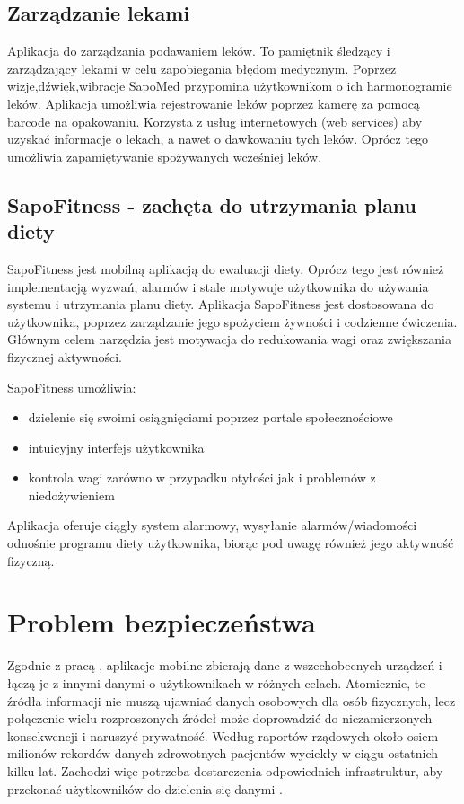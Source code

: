\subsection{Zarządzanie lekami \cite{6655256}}
 Aplikacja do zarządzania podawaniem leków. To pamiętnik śledzący i zarządzający lekami w celu zapobiegania błędom medycznym. 
 Poprzez wizje,dźwięk,wibracje  SapoMed przypomina użytkownikom o ich harmonogramie leków.
 Aplikacja umożliwia rejestrowanie leków poprzez kamerę za pomocą barcode na opakowaniu. 
 Korzysta z usług internetowych (web services) aby uzyskać informacje o lekach, a nawet o dawkowaniu tych leków. Oprócz tego umożliwia zapamiętywanie spożywanych wcześniej leków.

\subsection{SapoFitness - zachęta do utrzymania planu diety \cite{6026782}}
SapoFitness jest mobilną aplikacją do ewaluacji diety. Oprócz tego jest również implementacją wyzwań, alarmów i stale motywuje użytkownika do używania systemu i utrzymania planu diety. Aplikacja SapoFitness jest dostosowana do użytkownika, poprzez zarządzanie jego spożyciem żywności i codzienne ćwiczenia. Głównym celem narzędzia jest motywacja do redukowania wagi oraz zwiększania fizycznej aktywności. 

SapoFitness umożliwia:
\begin{itemize}
\item dzielenie się swoimi osiągnięciami poprzez portale społecznościowe
\item intuicyjny interfejs użytkownika
\item kontrola wagi zarówno w przypadku otyłości jak i problemów z niedożywieniem
\end{itemize}
Aplikacja oferuje ciągły system alarmowy, wysyłanie alarmów/wiadomości odnośnie programu diety użytkownika, biorąc pod uwagę również jego aktywność fizyczną.


\section{Problem bezpieczeństwa}
\label{sec:problem_bezp}
Zgodnie z pracą \cite{Ammar2014}, aplikacje mobilne zbierają dane z wszechobecnych urządzeń i łączą je z innymi danymi o użytkownikach w różnych celach. Atomicznie, te źródła informacji nie muszą ujawniać danych osobowych dla osób fizycznych, lecz połączenie wielu rozproszonych źródeł może doprowadzić do niezamierzonych konsekwencji i naruszyć prywatność. Według raportów rządowych około osiem milionów rekordów danych zdrowotnych pacjentów wyciekły w ciągu ostatnich kilku lat. Zachodzi więc potrzeba dostarczenia odpowiednich infrastruktur, aby przekonać użytkowników do dzielenia się danymi \cite{Ammar2014}. 

